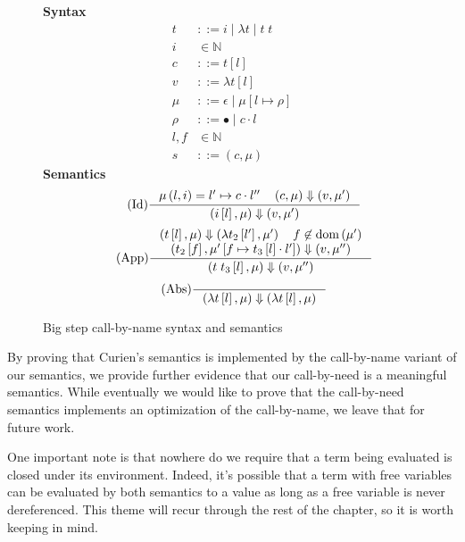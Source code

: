 \begin{figure}
\textbf{Syntax}
\begin{align*}
\tag{Term} t &::= i \; | \; \lambda t \; | \; t \; t  \\
\tag{Variable} i &\in \mathbb{N}  \\
\tag{Closure} c &::= t \left[l\right] \\
\tag{Value} v &::= \lambda t \left[l\right] \\
\tag{Heap} \mu &::= \epsilon \; | \; \mu \left[ l \mapsto \rho \right] \\
\tag{Environment} \rho &::= \bullet \; | \; c \cdot l \\
\tag{Location} l,f &\in \mathbb{N}  \\
\tag{Configuration} s &::= \left(c, \mu \right)
\end{align*}
\textbf{Semantics}
\begin{align*}
\tag{Id} \inference
{\mu \left( l, i \right) = l' \mapsto c \cdot l'' \quad 
 \left(c, \mu\right) \Downarrow \left(v, \mu'\right)}
{\left(i\left[l\right],\mu\right) \Downarrow \left(v, \mu'\right)}
\end{align*}
\begin{align*}
\tag{App} \inference
{\left(t\left[l\right], \mu\right) \Downarrow \left(\lambda t_2\left[l'\right], \mu'\right) 
   \quad f \not \in \textnormal{dom}\left(\mu'\right)
   \\ \left(t_2\left[f\right], \mu'\left[f \mapsto t_3\left[l\right] \cdot l'\right]\right)
         \Downarrow 
      \left(v, \mu'' \right) 
   }
{\left(t \; t_3\left[l\right], \mu\right) \Downarrow \left(v, \mu'' \right)}  
\end{align*}
\begin{align*}
\tag{Abs} \inference {} {\left(\lambda t\left[l\right], \mu\right) \Downarrow \left(\lambda t\left[l\right], \mu\right)}
\end{align*}
\caption{Big step call-by-name \ce syntax and semantics}
\label{fig:bigstepname}
\end{figure}

By proving that Curien's semantics is implemented by the call-by-name variant of
our semantics, we provide further evidence that our call-by-need is a
meaningful semantics. While eventually we would like to prove that the
call-by-need semantics implements an optimization of the call-by-name, we leave
that for future work.

One important note is that nowhere do we require that a term being evaluated is
closed under its environment. Indeed, it's possible that a term with free variables
can be evaluated by both semantics to a value as long as a free variable is
never dereferenced. This theme will recur through the rest of the chapter, so it
is worth keeping in mind.  
